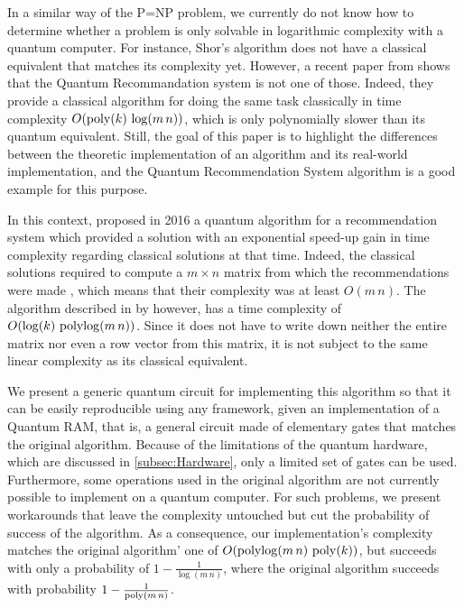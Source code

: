 \documentclass[11pt, a4paper]{article}
\begin{document}
        In a similar way of the P=NP problem, we currently do not know how to determine whether a problem is only solvable in logarithmic complexity with a quantum computer. For instance, Shor's algorithm \cite{Shor} does not have a classical equivalent that matches its complexity yet. However, a recent paper from \citeauthor{Dequantized} shows that the Quantum Recommandation system is not one of those. Indeed, they provide a classical algorithm for doing the same task classically in time complexity \(O(\operatorname{poly}(k)\,\log(m\,n))\), which is only polynomially slower than its quantum equivalent. Still, the goal of this paper is to highlight the differences between the theoretic implementation of an algorithm and its real-world implementation, and the Quantum Recommendation System algorithm is a good example for this purpose.
        
        In this context, \citeauthor{QRS} proposed in 2016 a quantum algorithm for a recommendation system which provided a solution with an exponential speed-up gain in time complexity regarding classical solutions at that time. Indeed, the classical solutions required to compute a \(m\times n\) matrix from which the recommendations were made \cite{Amazon}, which means that their complexity was at least \(O(m\,n)\). The algorithm described in \cite{QRS} by \citeauthor{QRS} however, has a time complexity of \(O(\log(k)\,\operatorname{polylog}(m\,n))\). Since it does not have to write down neither the entire matrix nor even a row vector from this matrix, it is not subject to the same linear complexity as its classical equivalent.
        
        We present a generic quantum circuit for implementing this algorithm so that it can be easily reproducible using any framework, given an implementation of a Quantum RAM, that is, a general circuit made of elementary gates that matches the original algorithm. Because of the limitations of the quantum hardware, which are discussed in \autoref{subsec:Hardware}, only a limited set of gates can be used. Furthermore, some operations used in the original algorithm are not currently possible to implement on a quantum computer. For such problems, we present workarounds that leave the complexity untouched but cut the probability of success of the algorithm. As a consequence, our implementation's complexity matches the original algorithm' one of \(O(\operatorname{polylog}(m\,n)\,\operatorname{poly}(k))\), but succeeds with only a probability of \(1-\frac{1}{\log(m\,n)}\), where the original algorithm succeeds with probability \(1 - \frac{1}{\operatorname{poly}(m\,n)}\).
        
\end{document}
